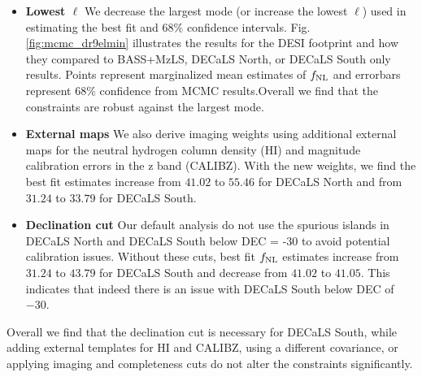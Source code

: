 \begin{itemize}
\item \textbf{Lowest $\ell$} 
We decrease the largest mode (or increase the lowest $\ell$) used in estimating the best fit and $68\%$ confidence intervals. Fig. \ref{fig:mcmc_dr9elmin} illustrates the results for the DESI footprint and how they compared to BASS+MzLS, DECaLS North, or DECaLS South only results. Points represent marginalized mean estimates of $f_{\rm NL}$ and errorbars represent $68$\% confidence from MCMC results.Overall we find that the constraints are robust against the largest mode.

\item \textbf{External maps} We also derive imaging weights using additional external maps for the neutral hydrogen column density (HI) and magnitude calibration errors in the z band (CALIBZ). With the new weights, we find the best fit estimates increase from $41.02$ to $55.46$ for DECaLS North and from $31.24$ to $33.79$ for DECaLS South.

\item \textbf{Declination cut} Our default analysis do not use the spurious islands in DECaLS North and DECaLS South below DEC = -30 to avoid potential calibration issues.  Without these cuts, best fit $f_{\rm NL}$ estimates increase from $31.24$ to $43.79$ for DECaLS South and decrease from $41.02$ to $41.05$. This indicates that indeed there is an issue with DECaLS South below DEC of $-30$.

\end{itemize}

Overall we find that the declination cut is necessary for DECaLS South, while adding external templates for HI and CALIBZ, using a different covariance, or applying imaging and completeness cuts do not alter the constraints significantly.



